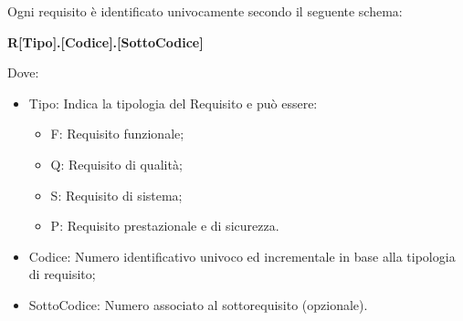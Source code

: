 
    Ogni requisito è identificato univocamente secondo il seguente schema:
        \begin{center}
            \large{\textbf{R[Tipo].[Codice].[SottoCodice]}}
        \end{center}
    Dove:
    \begin{itemize}
        \item Tipo: Indica la tipologia del Requisito e può essere:
          \begin{itemize}
            \item F: Requisito funzionale;
            \item Q: Requisito di qualità;
            \item S: Requisito di sistema;
            \item P: Requisito prestazionale e di sicurezza.
          \end{itemize}
        \item Codice: Numero identificativo univoco ed incrementale in base alla tipologia di requisito;
        \item SottoCodice: Numero associato al sottorequisito (opzionale).
    \end{itemize}

